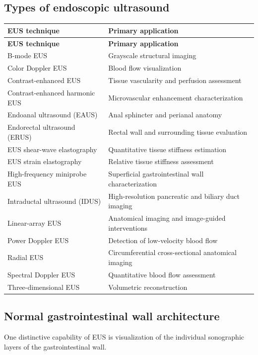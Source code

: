 \subsection{Types of endoscopic ultrasound}
\begin{longtable}{@{}p{}p{}@{}}
\toprule
\textbf{EUS technique} & \textbf{Primary application} \\
\midrule
\endfirsthead
\toprule
\textbf{EUS technique} & \textbf{Primary application} \\
\midrule
\endhead
B-mode EUS & Grayscale structural imaging \\
Color Doppler EUS & Blood flow visualization \\
Contrast-enhanced EUS & Tissue vascularity and perfusion assessment \\
Contrast-enhanced harmonic EUS & Microvascular enhancement characterization \\
Endoanal ultrasound (EAUS) & Anal sphincter and perianal anatomy \\
Endorectal ultrasound (ERUS) & Rectal wall and surrounding tissue evaluation \\
EUS shear-wave elastography & Quantitative tissue stiffness estimation \\
EUS strain elastography & Relative tissue stiffness assessment \\
High-frequency miniprobe EUS & Superficial gastrointestinal wall characterization \\
Intraductal ultrasound (IDUS) & High-resolution pancreatic and biliary duct imaging \\
Linear-array EUS & Anatomical imaging and image-guided interventions \\
Power Doppler EUS & Detection of low-velocity blood flow \\
Radial EUS & Circumferential cross-sectional anatomical imaging \\
Spectral Doppler EUS & Quantitative blood flow assessment \\
Three-dimensional EUS & Volumetric reconstruction \\
\bottomrule
\end{longtable}

\subsection{Normal gastrointestinal wall architecture}
One distinctive capability of EUS is visualization of the individual sonographic layers of the gastrointestinal wall.

